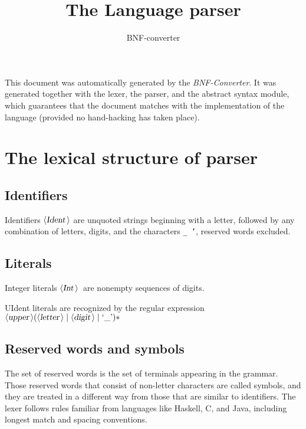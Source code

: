 \documentclass[a4paper,11pt]{article}
\author{BNF-converter}
\title{The Language parser}
\begin{document}
\maketitle

\newcommand{\emptyP}{\mbox{$\epsilon$}}
\newcommand{\terminal}[1]{\mbox{{\texttt {#1}}}}
\newcommand{\nonterminal}[1]{\mbox{$\langle \mbox{{\sl #1 }} \! \rangle$}}
\newcommand{\arrow}{\mbox{::=}}
\newcommand{\delimit}{\mbox{$|$}}
\newcommand{\reserved}[1]{\mbox{{\texttt {#1}}}}
\newcommand{\literal}[1]{\mbox{{\texttt {#1}}}}
\newcommand{\symb}[1]{\mbox{{\texttt {#1}}}}

This document was automatically generated by the {\em BNF-Converter}. It was generated together with the lexer, the parser, and the abstract syntax module, which guarantees that the document matches with the implementation of the language (provided no hand-hacking has taken place).

\section*{The lexical structure of parser}
\subsection*{Identifiers}
Identifiers \nonterminal{Ident} are unquoted strings beginning with a letter,
followed by any combination of letters, digits, and the characters {\tt \_ '},
reserved words excluded.


\subsection*{Literals}
Integer literals \nonterminal{Int}\ are nonempty sequences of digits.




UIdent literals are recognized by the regular expression
\({\nonterminal{upper}} ({\nonterminal{letter}} \mid {\nonterminal{digit}} \mid \mbox{`\_'})*\)


\subsection*{Reserved words and symbols}
The set of reserved words is the set of terminals appearing in the grammar. Those reserved words that consist of non-letter characters are called symbols, and they are treated in a different way from those that are similar to identifiers. The lexer follows rules familiar from languages like Haskell, C, and Java, including longest match and spacing conventions.
\end{document}
